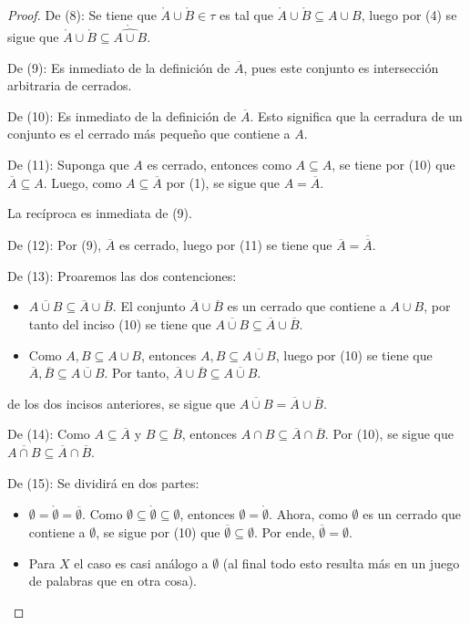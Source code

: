 \documentclass[12pt]{report}
\theoremstyle{largebreak}
\newcommand{\Int}[1]{\ensuremath{\mathring{#1}}}
\newcommand{\Cls}[1]{\ensuremath{\overline{#1}}}
\begin{document}
\begin{proof}
        De (8): Se tiene que $\Int{A}\cup\Int{B}\in\tau$ es tal que $\Int{A}\cup\Int{B}\subseteq A\cup B$, luego por (4) se sigue que $\Int{A}\cup\Int{B}\subseteq\Int{\widehat{A\cup B}}$.

        De (9): Es inmediato de la definición de $\Cls{A}$, pues este conjunto es intersección arbitraria de cerrados.

        De (10): Es inmediato de la definición de $\Cls{A}$. Esto significa que la cerradura de un conjunto es el cerrado más pequeño que contiene a $A$.

        De (11): Suponga que $A$ es cerrado, entonces como $A\subseteq A$, se tiene por (10) que $\Cls{A}\subseteq A$. Luego, como $A\subseteq \Cls{A}$ por (1), se sigue que $A=\Cls{A}$.
        
        La recíproca es inmediata de (9).

        De (12): Por (9), $\Cls{A}$ es cerrado, luego por (11) se tiene que $\Cls{A}=\Cls{\Cls{A}}$.

        De (13): Proaremos las dos contenciones:
        \begin{itemize}
            \item $\Cls{A\cup B}\subseteq\Cls{A}\cup\Cls{B}$. El conjunto $\Cls{A}\cup\Cls{B}$ es un cerrado que contiene a $A\cup B$, por tanto del inciso (10) se tiene que $\Cls{A\cup B}\subseteq\Cls{A}\cup\Cls{B}$.
            \item Como $A, B\subseteq A\cup B$, entonces $A,B\subseteq \Cls{A\cup B}$, luego por (10) se tiene que $\Cls{A},\Cls{B}\subseteq \Cls{A\cup B}$. Por tanto, $\Cls{A}\cup\Cls{B}\subseteq\Cls{A\cup B}$.
        \end{itemize}
        de los dos incisos anteriores, se sigue que $\Cls{A\cup B}=\Cls{A}\cup\Cls{B}$.

        De (14): Como $A\subseteq\Cls{A}$ y $B\subseteq\Cls{B}$, entonces $A\cap B\subseteq\Cls{A}\cap\Cls{B}$. Por (10), se sigue que $\Cls{A\cap B}\subseteq\Cls{A}\cap\Cls{B}$.

        De (15): Se dividirá en dos partes:
        \begin{itemize}
            \item $\emptyset=\Int{\emptyset}=\Cls{\emptyset}$. Como $\emptyset\subseteq\Int{\emptyset}\subseteq\emptyset$, entonces $\emptyset=\Int{\emptyset}$. Ahora, como $\emptyset$ es un cerrado que contiene a $\emptyset$, se sigue por (10) que $\Cls{\emptyset}\subseteq\emptyset$. Por ende, $\Cls{\emptyset}=\emptyset$.
            \item Para $X$ el caso es casi análogo a $\emptyset$ (al final todo esto resulta más en un juego de palabras que en otra cosa).
        \end{itemize}


\end{proof}
\end{document}
